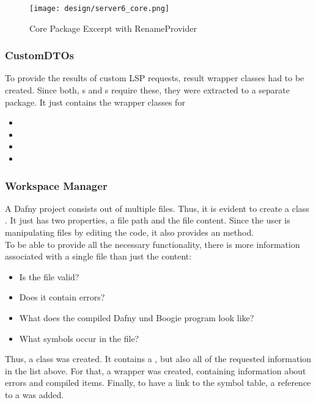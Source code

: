 \begin{figure}[H]
    \centering
    \texttt{[image: design/server6\_core.png]}
    \caption{Core Package Excerpt with RenameProvider}
    \label{fig:server_core}
\end{figure}

\subsubsection{CustomDTOs}
To provide the results of custom LSP requests, result wrapper classes had to be created.
Since both, s and s require these, they were extracted to a separate package.
It just contains the wrapper classes for
\begin{itemize}
    \item {}
    \item {}
    \item {}
    \item {}
\end{itemize}

\subsubsection{Workspace Manager}
A Dafny project consists out of multiple  files.
Thus, it is evident to create a class .
It just has two properties, a file path and the file content.
Since the user is manipulating files by editing the code, it also provides an  method.\\

To be able to provide all the necessary functionality, there is more information associated with a single file than just the content:
\begin{itemize}
    \item Is the file valid?
    \item Does it contain errors?
    \item What does the compiled Dafny und Boogie program look like?
    \item What symbols occur in the file?
\end{itemize}

Thus, a class  was created.
It contains a , but also all of the requested information in the list above.
For that, a wrapper  was created, containing information about errors and compiled items.
Finally, to have a link to the symbol table, a reference to a  was added.\\

